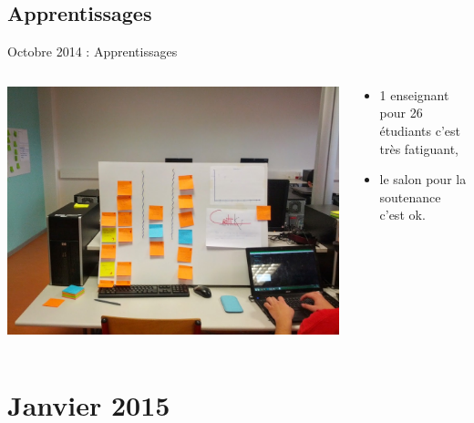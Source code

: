 \documentclass{beamer}
\begin{document}
\subsection{Apprentissages}
\begin{frame}{Octobre 2014 : Apprentissages}
  \begin{columns}
    \begin{column}{0.5\textwidth}
      \begin{center}
        \includegraphics[width=\textwidth]{includes/201410_dashboard.jpg}      
      \end{center}
    \end{column}
    \begin{column}{0.5\textwidth}
      \begin{itemize}
        \item 1 enseignant pour 26 étudiants c'est très fatiguant,
        \item le salon pour la soutenance c'est ok.
      \end{itemize}
    \end{column}
  \end{columns}
\end{frame}

\section{Janvier 2015}
\end{document}
